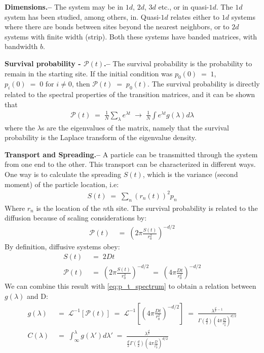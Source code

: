 { \bf Dimensions.-- } The system may be in $1d$, $2d$, $3d$ etc., or in quasi-$1d$. The $1d$ system has been studied, among others, in\cite{Parris:1986}\cite{Alexander:1981:RMP}\cite{AslangulChvosta:1995}.  Quasi-$1d$ relates either to $1d$ systems where there are bonds between sites beyond the nearest neighbors, or to $2d$ systems with finite width (strip). Both these systems have banded matrices, with bandwidth $b$.

{ \bf Survival probability - $\mathcal{P}(t)$.--} 
The survival probability is the probability to remain in the starting site. If the initial condition was $p_0(0)\;=\;1$, $p_i(0)\;=\;0 \textrm{  for  } i\neq 0$, then $\mathcal{P}(t)\;=\; p_0(t)$. The survival probability is directly related to the spectral properties of the transition matrices, and it can be shown that 
\begin{align} \label{eq:p_t_spectrum}
\mathcal{P}(t) \;=\; \frac{1}{N}\sum_\lambda e^{\lambda t} \;\rightarrow\;\frac{1}{N}\int e^{\lambda t}g(\lambda)d\lambda
\end{align}
where the $\lambda$s are the eigenvalues of the matrix, namely that the survival probability is the Laplace transform of the eigenvalue density.

{ \bf Transport and Spreading.--}  %
A particle can be transmitted through the system from one end to the other. This transport can be characterized in different ways. One way is to calculate the spreading $S(t)$, which is the variance (second moment) of the particle location, i.e:
\begin{align}
  S(t) \;=\; \sum_n \left(r_n(t)\right)^2 p_n  %
\end{align}
Where $r_n$ is the location of the $n$th site. The survival probability is related to the diffusion because of scaling considerations by:
\begin{align}
\mathcal{P}(t) &\;=\; \left(2\pi \frac{S(t)}{r_0^2}\right)^{-d/2}
\end{align}
By definition, diffusive systems obey: 
\begin{align}
S(t) &\;=\; 2Dt  \\
\mathcal{P}(t) &\;=\; \left(2\pi \frac{S(t)}{r_0^2}\right)^{-d/2} \;=\; \left(4\pi \frac{Dt}{r_0^2} \right)^{-d/2}
\end{align}
We can combine this result with \ref{eq:p_t_spectrum} to obtain a relation between $g(\lambda)$ and D:
\begin{align}
    g(\lambda) &\;=\; \mathcal{L}^{-1}[\mathcal{P}(t)] \;=\; \mathcal{L}^{-1}\left[ \left(4\pi \frac{Dt}{r_0^2} \right)^{-d/2}\right] \;=\; \frac{\lambda^{\frac{d}{2}-1}}{\Gamma\left(\frac{d}{2}\right)\left(4\pi \frac{D}{r_0^2}\right)^{d/2}}  \\
    C(\lambda) &\;=\; \int_{\infty}^{\lambda} g(\lambda')d\lambda' \;=\; \frac{\lambda^{\frac{d}{2}}}{\frac{d}{2}\Gamma\left(\frac{d}{2}\right)\left(4\pi \frac{D}{r_0^2}\right)^{d/2}}
\label{eq:C_D}
\end{align}


